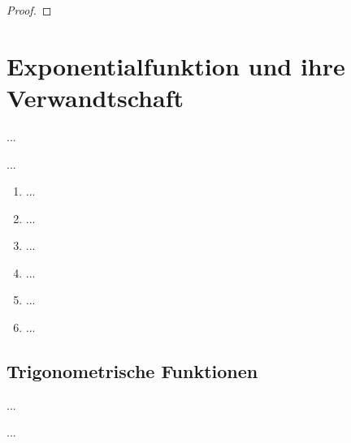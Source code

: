 \documentclass[12pt]{scrreprt}
\begin{document}
\begin{thm}\label{}

\end{thm}
\begin{proof}

\end{proof}

\begin{bsp}\label{}

\end{bsp}

\section{Exponentialfunktion und ihre Verwandtschaft}
\label{}
...

\begin{dfn}\label{}

\end{dfn}

\begin{dfn}\label{}

\end{dfn}

\begin{bem}\label{}
...
\begin{enumerate}
\item ...
\item ...
\item ...
\item ...
\item ...
\item ...
\end{enumerate}
\end{bem}

\subsection*{Trigonometrische Funktionen}
...

\begin{satz}\label{}

\end{satz}

\begin{dfn*}

\end{dfn*}

...

\begin{dfn}\label{}

\end{dfn}
\end{document}
